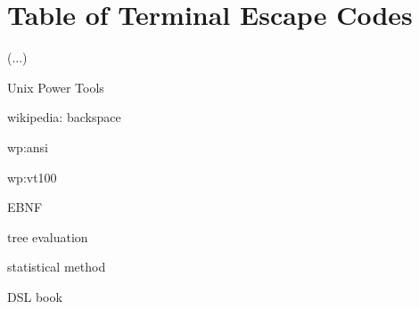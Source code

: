 \documentclass[a4paper,twoside,abstract=on,cleardoublepage=empty,numbers=noenddot,toc=bib]{scrreprt}
\begin{document}
\chapter{Table of Terminal Escape Codes}

(...)

\begin{thebibliography}{99}
    \bibitem{}
        Unix Power Tools

    \bibitem{}
        wikipedia: backspace

    \bibitem{}
        wp:ansi

    \bibitem{}
        wp:vt100

    \bibitem{}
        EBNF

    \bibitem{}
        tree evaluation

    \bibitem{}
        statistical method

    \bibitem{}
        DSL book
\end{thebibliography}
\end{document}

